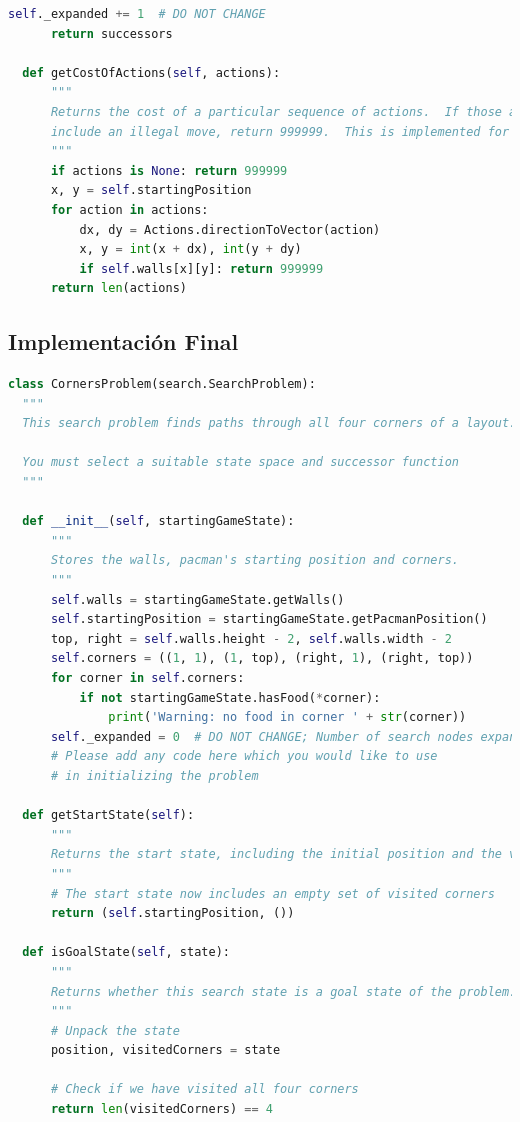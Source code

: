 \documentclass{report}
\begin{document}
\begin{lstlisting}[language=Python, caption=Implementación inicial del problema de las esquinas]
      self._expanded += 1  # DO NOT CHANGE
      return successors

  def getCostOfActions(self, actions):
      """
      Returns the cost of a particular sequence of actions.  If those actions
      include an illegal move, return 999999.  This is implemented for you.
      """
      if actions is None: return 999999
      x, y = self.startingPosition
      for action in actions:
          dx, dy = Actions.directionToVector(action)
          x, y = int(x + dx), int(y + dy)
          if self.walls[x][y]: return 999999
      return len(actions)
          \end{lstlisting}
        \subsection*{Implementación Final}
          \begin{lstlisting}[language=Python, caption=Implementación final del problema de las esquinas]
class CornersProblem(search.SearchProblem):
  """
  This search problem finds paths through all four corners of a layout.

  You must select a suitable state space and successor function
  """

  def __init__(self, startingGameState):
      """
      Stores the walls, pacman's starting position and corners.
      """
      self.walls = startingGameState.getWalls()
      self.startingPosition = startingGameState.getPacmanPosition()
      top, right = self.walls.height - 2, self.walls.width - 2
      self.corners = ((1, 1), (1, top), (right, 1), (right, top))
      for corner in self.corners:
          if not startingGameState.hasFood(*corner):
              print('Warning: no food in corner ' + str(corner))
      self._expanded = 0  # DO NOT CHANGE; Number of search nodes expanded
      # Please add any code here which you would like to use
      # in initializing the problem
              
  def getStartState(self):
      """
      Returns the start state, including the initial position and the visited corners.
      """
      # The start state now includes an empty set of visited corners
      return (self.startingPosition, ())

  def isGoalState(self, state):
      """
      Returns whether this search state is a goal state of the problem.
      """
      # Unpack the state
      position, visitedCorners = state

      # Check if we have visited all four corners
      return len(visitedCorners) == 4


\end{lstlisting}
\end{document}
